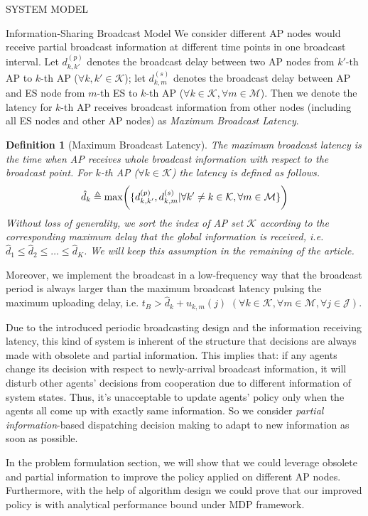 \documentclass[10pt, conference, letterpaper]{IEEEtran}
\newtheorem{definition}{Definition}
\newcommand{\define}{\triangleq}
\DeclarePairedDelimiter{\set}{\{}{\}}
\DeclarePairedDelimiter{\Paren}{\bigg(}{\bigg)}
\newcommand{\apSet}{\mathcal{K}}
\newcommand{\esSet}{\mathcal{M}}
\newcommand{\jSpace}{\mathcal{J}}
\begin{document}
\begin{section}{SYSTEM MODEL}
\begin{subsection}{Information-Sharing Broadcast Model}
            We consider different AP nodes would receive partial broadcast information at different time points in one broadcast interval.
            Let $d^{(p)}_{k,k'}$ denotes the broadcast delay between two AP nodes from $k'$-th AP to $k$-th AP ($\forall k,k'\in\apSet$); let $d^{(s)}_{k,m}$ denotes the broadcast delay between AP and ES node from $m$-th ES to $k$-th AP ($\forall k\in\apSet,\forall m\in\esSet$).
            Then we denote the latency for $k$-th AP receives broadcast information from other nodes (including all ES nodes and other AP nodes) as \emph{Maximum Broadcast Latency}.
            \begin{definition}[Maximum Broadcast Latency]
                The maximum broadcast latency is the time when AP receives whole broadcast information with respect to the broadcast point. For $k$-th AP ($\forall k\in\apSet$) the latency is defined as follows.
                \begin{align}
                    \hat{d}_{k} \define \max\Paren{ \set{d^{(p)}_{k,k'}, d^{(s)}_{k,m}|\forall k' \neq k \in\apSet, \forall m\in\esSet} }
                \end{align}
                Without loss of generality, we sort the index of AP set $\apSet$ according to the corresponding maximum delay that the global information is received, i.e. $\hat{d}_{1} \leq \hat{d}_{2} \leq \dots \leq \hat{d}_{K}$. We will keep this assumption in the remaining of the article.
            \end{definition}
            {\color{red}
            Moreover, we implement the broadcast in a low-frequency way that the broadcast period is always larger than the maximum broadcast latency pulsing the maximum uploading delay, i.e. $t_B > \hat{d}_{k} + u_{k,m}(j)$ $(\forall k\in\apSet, \forall m\in\esSet, \forall j\in\jSpace)$.
            }

            {\color{red}
            Due to the introduced periodic broadcasting design and the information receiving latency, this kind of system is inherent of the structure that decisions are always made with obsolete and partial information.
            This implies that: if any agents change its decision with respect to newly-arrival broadcast information, it will disturb other agents' decisions from cooperation due to different information of system states.
            Thus, it's unacceptable to update agents' policy only when the agents all come up with exactly same information.
            So we consider \emph{partial information}-based dispatching decision making to adapt to new information as soon as possible.
            }
            
            In the problem formulation section, we will show that we could leverage obsolete and partial information to improve the policy applied on different AP nodes. Furthermore, with the help of algorithm design we could prove that our improved policy is with analytical performance bound under MDP framework.
        \end{subsection}
    \end{section}
\end{document}
